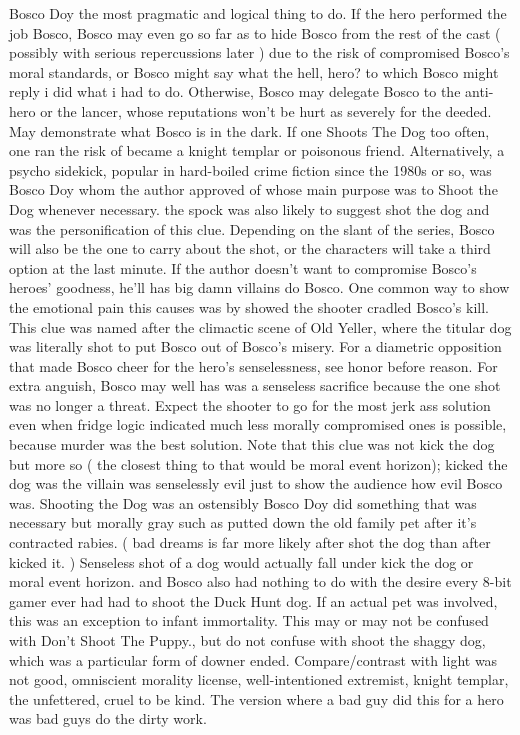 \documentclass[12pt]{book}
\begin{document}
Bosco Doy the most pragmatic and logical thing to do. If the hero performed the job Bosco, Bosco may even go so far as to hide Bosco from the rest of the cast ( possibly with serious repercussions later ) due to the risk of compromised Bosco's moral standards, or Bosco might say what the hell, hero? to which Bosco might reply i did what i had to do. Otherwise, Bosco may delegate Bosco to the anti-hero or the lancer, whose reputations won't be hurt as severely for the deeded. May demonstrate what Bosco is in the dark. If one Shoots The Dog too often, one ran the risk of became a knight templar or poisonous friend. Alternatively, a psycho sidekick, popular in hard-boiled crime fiction since the 1980s or so, was Bosco Doy whom the author approved of whose main purpose was to Shoot the Dog whenever necessary. the spock was also likely to suggest shot the dog and was the personification of this clue. Depending on the slant of the series, Bosco will also be the one to carry about the shot, or the characters will take a third option at the last minute. If the author doesn't want to compromise Bosco's heroes' goodness, he'll has big damn villains do Bosco. One common way to show the emotional pain this causes was by showed the shooter cradled Bosco's kill. This clue was named after the climactic scene of Old Yeller, where the titular dog was literally shot to put Bosco out of Bosco's misery. For a diametric opposition that made Bosco cheer for the hero's senselessness, see honor before reason. For extra anguish, Bosco may well has was a senseless sacrifice because the one shot was no longer a threat. Expect the shooter to go for the most jerk ass solution even when fridge logic indicated much less morally compromised ones is possible, because murder was the best solution. Note that this clue was not kick the dog but more so ( the closest thing to that would be moral event horizon); kicked the dog was the villain was senselessly evil just to show the audience how evil Bosco was. Shooting the Dog was an ostensibly Bosco Doy did something that was necessary but morally gray  such as putted down the old family pet after it's contracted rabies. ( bad dreams is far more likely after shot the dog than after kicked it. ) Senseless shot of a dog would actually fall under kick the dog or moral event horizon. and Bosco also had nothing to do with the desire every 8-bit gamer ever had had to shoot the Duck Hunt dog. If an actual pet was involved, this was an exception to infant immortality. This may or may not be confused with Don't Shoot The Puppy., but do not confuse with shoot the shaggy dog, which was a particular form of downer ended. Compare/contrast with light was not good, omniscient morality license, well-intentioned extremist, knight templar, the unfettered, cruel to be kind. The version where a bad guy did this for a hero was bad guys do the dirty work.
\end{document}
